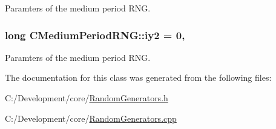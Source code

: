 Paramters of the medium period R\-N\-G. 

\hypertarget{class_c_medium_period_r_n_g_a1da6d94f9e9e3fe4b83f9a6ae3c81825}{
\subsubsection[{iy2}]{\setlength{\rightskip}{0pt plus 5cm}long C\-Medium\-Period\-R\-N\-G\-::iy2 = 0\hspace{0.3cm}{\ttfamily [static]}, {\ttfamily [private]}}}\label{class_c_medium_period_r_n_g_a1da6d94f9e9e3fe4b83f9a6ae3c81825}


Paramters of the medium period R\-N\-G. 



The documentation for this class was generated from the following files\-:\begin{DoxyCompactItemize}
\item 
C\-:/\-Development/core/\hyperlink{_random_generators_8h}{Random\-Generators.\-h}\item 
C\-:/\-Development/core/\hyperlink{_random_generators_8cpp}{Random\-Generators.\-cpp}\end{DoxyCompactItemize}
